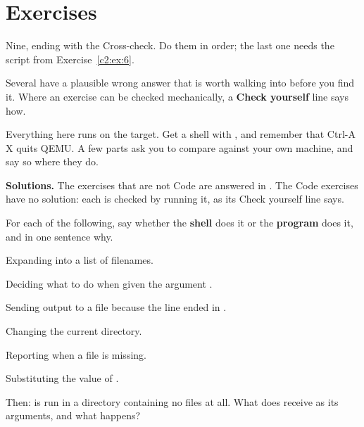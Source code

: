 
\section{Exercises}
\label{c2:sec:exercises}\label{c2:app:c}

\begin{aside}
Nine, ending with the Cross-check. Do them in order; the last one needs the script from
Exercise~\ref{c2:ex:6}.

Several have a plausible wrong answer that is worth walking into before you find it. Where an
exercise can be checked mechanically, a \textbf{Check yourself} line says how.

Everything here runs on the target. Get a shell with , and remember that Ctrl-A X
quits QEMU. A few parts ask you to compare against your own machine, and say so where they do.

\textbf{Solutions.} The exercises that are not Code are answered in . The Code
exercises have no solution: each is checked by running it, as its Check yourself line says.
\end{aside}

\label{c2:ex:1}

For each of the following, say whether the \textbf{shell} does it or the \textbf{program} does it,
and in one sentence why.

 Expanding  into a list of filenames.

 Deciding what to do when given the argument .

 Sending output to a file because the line ended in .

 Changing the current directory.

 Reporting  when a file is missing.

 Substituting the value of .

Then:  is run in a directory containing no  files at all. What does
 receive as its arguments, and what happens?

\label{c2:ex:2}

